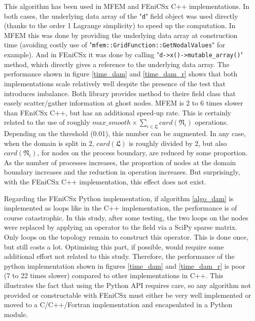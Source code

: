 \documentclass[12pt]{article}
\newcommand{\f}[1]{FEniCSx#1}
\newcommand{\mycode}[1]{\textsf{"}\lstinline`#1`\textsf{"}}
\begin{document}
This algorithm has been used in MFEM and \f{} C++ implementations. In both cases, the underlying data array of the \mycode{d} field object was used directly (thanks to the order 1 Lagrange simplicity) to speed up the computation. In MFEM this was done by providing the underlying data array at construction time (avoiding costly use of \mycode{mfem::GridFunction::GetNodalValues} for example). And in \f{} it was done by calling \mycode{d->x()->mutable_array()} method, which directly gives a reference to the underlying data array.
The performance shown in figure \ref{time_dam} and \ref{time_dam_r} shows that both implementations scale relatively well despite the presence of the test that introduces imbalance.
Both library provides method to theire field class that easely scatter/gather information at ghost nodes.
MFEM is 2 to 6 times slower than \f{} C++, but has an additional speed-up rate.
This is certainly related to the use of roughly $max\_smooth \times \displaystyle\sum_{i\in \mathfrak{L}} card\left(\mathfrak{N}_i\right)$ operations. Depending on the threshold (0.01), this number can be augmented. In any case, when the domain is split in 2, $card\left(\mathfrak{L}\right)$ is roughly divided by 2, but also $card\left(\mathfrak{N}_i\right)$, for nodes on the process boundary,	 are reduced by some proportion. As the number of processes increases, the proportion of nodes at the domain boundary increases and the reduction in operation increases. But surprisingly, with the \f{} C++ implementation, this effect does not exist.

Regarding the \f{} Python implementation, if algorithm \ref{algo_dam} is implemented as loops like in the C++ implementation, the performance is of course catastrophic. 
In this study, after some testing, the two loops on the nodes were replaced by applying an operator to the field via a SciPy sparse matrix. Only loops on the topology remain to construct this operator. 
This is done once, but still costs a lot. Optimising this part, if possible,  would require some additional effort not related to this study. 
Therefore, the performance of the python implementation shown in figures \ref{time_dam} and \ref{time_dam_r} is poor (7 to 22 times slower) compared to other implementations in C++. This illustrates the fact that using the Python API requires care, so any algorithm not provided or constructable with \f{} must either be very well implemented or moved to a C/C++/Fortran implementation and encapsulated in a Python module.
\end{document}
